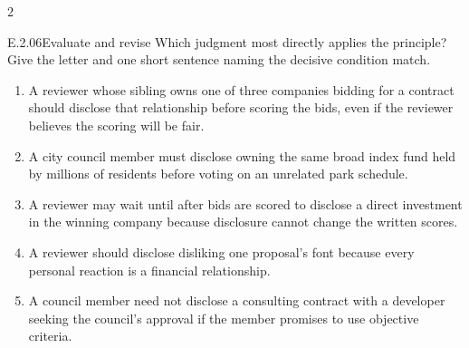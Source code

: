 \documentclass[9pt]{extarticle}
\newcommand{\choice}[1]{\item #1}
\begin{document}
\begin{multicols}{2}
\begin{DenseCoreProblem}{E.2.06}{Evaluate and revise}
Which judgment most directly applies the principle? Give the letter and one short sentence naming the decisive condition match.
\begin{enumerate}[label=(\alph*)]
  \choice{A reviewer whose sibling owns one of three companies bidding for a contract should disclose that relationship before scoring the bids, even if the reviewer believes the scoring will be fair.}
  \choice{A city council member must disclose owning the same broad index fund held by millions of residents before voting on an unrelated park schedule.}
  \choice{A reviewer may wait until after bids are scored to disclose a direct investment in the winning company because disclosure cannot change the written scores.}
  \choice{A reviewer should disclose disliking one proposal's font because every personal reaction is a financial relationship.}
  \choice{A council member need not disclose a consulting contract with a developer seeking the council's approval if the member promises to use objective criteria.}
\end{enumerate}
\end{DenseCoreProblem}
\end{multicols}
\CoreWorkArea
\FormBreak
{}
\end{document}
